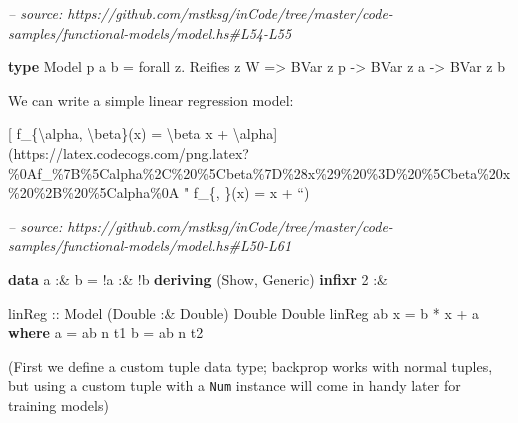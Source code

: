\documentclass[]{article}
\newenvironment{Shaded}{}{}
\newcommand{\CommentTok}[1]{\textcolor[rgb]{0.38,0.63,0.69}{\textit{#1}}}
\newcommand{\DataTypeTok}[1]{\textcolor[rgb]{0.56,0.13,0.00}{#1}}
\newcommand{\DecValTok}[1]{\textcolor[rgb]{0.25,0.63,0.44}{#1}}
\newcommand{\FunctionTok}[1]{\textcolor[rgb]{0.02,0.16,0.49}{#1}}
\newcommand{\KeywordTok}[1]{\textcolor[rgb]{0.00,0.44,0.13}{\textbf{#1}}}
\newcommand{\NormalTok}[1]{#1}
\newcommand{\OtherTok}[1]{\textcolor[rgb]{0.00,0.44,0.13}{#1}}
\begin{document}
\begin{Shaded}
\begin{Highlighting}[]
\CommentTok{-- source: https://github.com/mstksg/inCode/tree/master/code-samples/functional-models/model.hs#L54-L55}

\KeywordTok{type} \DataTypeTok{Model}\NormalTok{ p a b }\FunctionTok{=}\NormalTok{ forall z}\FunctionTok{.} \DataTypeTok{Reifies}\NormalTok{ z }\DataTypeTok{W}
                \OtherTok{=>} \DataTypeTok{BVar}\NormalTok{ z p }\OtherTok{->} \DataTypeTok{BVar}\NormalTok{ z a }\OtherTok{->} \DataTypeTok{BVar}\NormalTok{ z b}
\end{Highlighting}
\end{Shaded}

We can write a simple linear regression model:

{[} f\_\{\textbackslash{}alpha, \textbackslash{}beta\}(x) = \textbackslash{}beta
x +
\textbackslash{}alpha{]}(https://latex.codecogs.com/png.latex?\%0Af\_\%7B\%5Calpha\%2C\%20\%5Cbeta\%7D\%28x\%29\%20\%3D\%20\%5Cbeta\%20x\%20\%2B\%20\%5Calpha\%0A
" f\_\{\alpha, \beta\}(x) = \beta x + \alpha ``)

\begin{Shaded}
\begin{Highlighting}[]
\CommentTok{-- source: https://github.com/mstksg/inCode/tree/master/code-samples/functional-models/model.hs#L50-L61}

\KeywordTok{data}\NormalTok{ a }\FunctionTok{:&}\NormalTok{ b }\FunctionTok{=} \FunctionTok{!}\NormalTok{a }\FunctionTok{:&} \FunctionTok{!}\NormalTok{b}
  \KeywordTok{deriving}\NormalTok{ (}\DataTypeTok{Show}\NormalTok{, }\DataTypeTok{Generic}\NormalTok{)}
\KeywordTok{infixr} \DecValTok{2} \FunctionTok{:&}

\OtherTok{linReg ::} \DataTypeTok{Model}\NormalTok{ (}\DataTypeTok{Double} \FunctionTok{:&} \DataTypeTok{Double}\NormalTok{) }\DataTypeTok{Double} \DataTypeTok{Double}
\NormalTok{linReg ab x }\FunctionTok{=}\NormalTok{ b }\FunctionTok{*}\NormalTok{ x }\FunctionTok{+}\NormalTok{ a}
  \KeywordTok{where}
\NormalTok{    a }\FunctionTok{=}\NormalTok{ ab }\FunctionTok{^^.}\NormalTok{ t1}
\NormalTok{    b }\FunctionTok{=}\NormalTok{ ab }\FunctionTok{^^.}\NormalTok{ t2}
\end{Highlighting}
\end{Shaded}

(First we define a custom tuple data type; backprop works with normal tuples,
but using a custom tuple with a \texttt{Num} instance will come in handy later
for training models)
\end{document}
